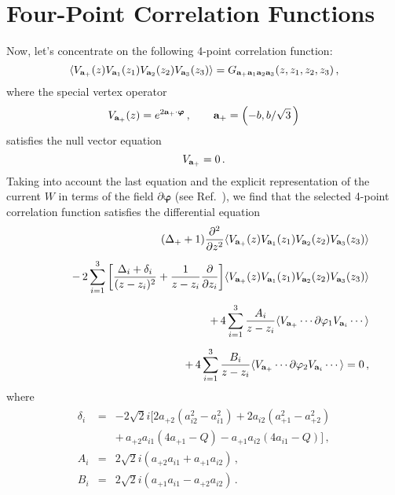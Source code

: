 \documentclass[a4paper,12pt]{article}
\newcommand{\bm}{\boldsymbol}
\begin{document}
\section{Four-Point Correlation Functions}
Now, let's concentrate on the following  4-point correlation function:
\begin{equation}	
\langle V_{{\bf a}_+}(z)V_{{\bf a}_1}(z_1)V_{{\bf a}_2}(z_2)
V_{{\bf a}_3}(z_3)\rangle
=G_{{\bf a}_+{\bf a}_1{\bf a}_2{\bf a}_3} (z,z_1,z_2,z_3)\, ,
\label{eq:14}
\end{equation}
where the special vertex operator
$$
V_{{\bf a}_+}(z)=e^{2{\bf a}_+\cdot{\bm\varphi}}\,,\qquad
{\bf a}_+=\left(-b,b/\sqrt3\,\right)
$$
satisfies the null vector equation
\begin{equation}	
[\Delta_+(5\Delta_++1)W_{-2}-12w_+L^2_{-1}+6w_+(\Delta_++1)L_{-2}]
V_{{\bf a}_+}=0\,.
\label{eq:16}
\end{equation}
Taking into account the last equation and the explicit representation
of the current $W$ in terms of the field $\partial{\bm\varphi}$ 
(see Ref.~\cite{LF}), we find that the selected 4-point correlation
function satisfies the differential equation
\begin{eqnarray}
&&(\Delta_++1)\frac{\partial^2}{\partial z^2}
\langle V_{{\bf a}_+}(z)V_{{\bf a}_1}(z_1)V_{{\bf a}_2}(z_2)
V_{{\bf a}_3}(z_3)\rangle\nonumber\\[5pt]
&&\hskip20pt -\,2\sum^3_{i=1}
\bigg[\frac{\Delta_i+\delta_i}{(z-z_i)^2}
+\frac{1}{z-z_i}\frac{\partial}{\partial z_i}\bigg]
\langle V_{{\bf a}_+}(z)V_{{\bf a}_1}(z_1)V_{{\bf a}_2}(z_2)
V_{{\bf a}_3}(z_3)\rangle\nonumber\\[5pt]
&&\hskip20pt +\,4\sum^3_{i=1}\frac{A_i}{z-z_i}
\langle V_{{\bf a}_+}\cdots\partial\varphi_1 V_{{\bf a}_i}\cdots\rangle
\nonumber\\[5pt]
&&\hskip20pt +\,4\sum^3_{i=1}\frac{B_i}{z-z_i}
\langle V_{{\bf a}_+}\cdots\partial\varphi_2V_{{\bf a}_i}\cdots\rangle=0\, ,
\label{eq:17}
\end{eqnarray}
where
\begin{eqnarray*}	
\begin{array}{rcl}
\delta_i &=&-2\sqrt2i
[2a_{+2}(a^2_{i2}-a^2_{i1})+2a_{i2}(a^2_{+1}-a^2_{+2})\\[8pt]
&&+\,a_{+2}a_{i1}(4a_{+1}-Q)-a_{+1}a_{i2}(4a_{i1}-Q)]\,,\\[8pt]
A_i &=&2\sqrt2i (a_{+2}a_{i1}+a_{+1}a_{i2})\,,\\[8pt]
B_i &=&2\sqrt2i (a_{+1}a_{i1}-a_{+2}a_{i2})\,.
\end{array}
\end{eqnarray*}
\end{document}
